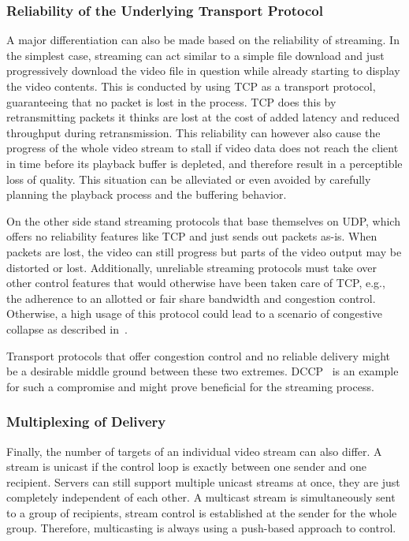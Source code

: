 \subsubsection{Reliability of the Underlying Transport Protocol}
A major differentiation can also be made based on the reliability of streaming. In the simplest case, streaming can act similar to a simple file download and just progressively download the video file in question while already starting to display the video contents. This is conducted by using \gls{TCP} as a transport protocol, guaranteeing that no packet is lost in the process. \gls{TCP} does this by retransmitting packets it thinks are lost at the cost of added latency and reduced throughput during retransmission. This reliability can however also cause the progress of the whole video stream to stall if video data does not reach the client in time before its playback buffer is depleted, and therefore result in a perceptible loss of quality. This situation can be alleviated or even avoided by carefully planning the playback process and the buffering behavior.

On the other side stand streaming protocols that base themselves on \gls{UDP}, which offers no reliability features like \gls{TCP} and just sends out packets as-is. When packets are lost, the video can still progress but parts of the video output may be distorted or lost. Additionally, unreliable streaming protocols must take over other control features that would otherwise have been taken care of \gls{TCP}, e.g., the adherence to an allotted or fair share bandwidth and congestion control. Otherwise, a high usage of this protocol could lead to a scenario of congestive collapse as described in~\cite{rfc896}.

Transport protocols that offer congestion control and no reliable delivery might be a desirable middle ground between these two extremes. \gls{DCCP}~\cite{kohler2006designing} is an example for such a compromise and might prove beneficial for the streaming process.


\subsubsection{Multiplexing of Delivery}
Finally, the number of targets of an individual video stream can also differ. A stream is unicast if the control loop is exactly between one sender and one recipient. Servers can still support multiple unicast streams at once, they are just completely independent of each other. A multicast stream is simultaneously sent to a group of recipients, stream control is established at the sender for the whole group. Therefore, multicasting is always using a push-based approach to control.


